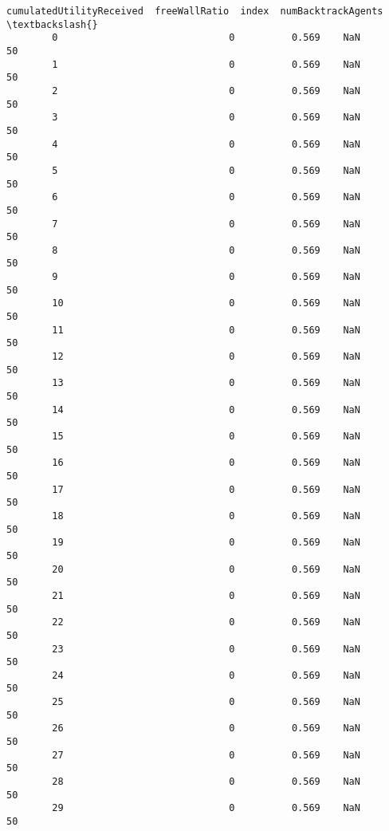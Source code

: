 \documentclass[11pt]{article}
\begin{document}
\begin{Verbatim}[commandchars=\\\{\}]
                cumulatedUtilityReceived  freeWallRatio  index  numBacktrackAgents  \textbackslash{}
        0                              0          0.569    NaN                  50   
        1                              0          0.569    NaN                  50   
        2                              0          0.569    NaN                  50   
        3                              0          0.569    NaN                  50   
        4                              0          0.569    NaN                  50   
        5                              0          0.569    NaN                  50   
        6                              0          0.569    NaN                  50   
        7                              0          0.569    NaN                  50   
        8                              0          0.569    NaN                  50   
        9                              0          0.569    NaN                  50   
        10                             0          0.569    NaN                  50   
        11                             0          0.569    NaN                  50   
        12                             0          0.569    NaN                  50   
        13                             0          0.569    NaN                  50   
        14                             0          0.569    NaN                  50   
        15                             0          0.569    NaN                  50   
        16                             0          0.569    NaN                  50   
        17                             0          0.569    NaN                  50   
        18                             0          0.569    NaN                  50   
        19                             0          0.569    NaN                  50   
        20                             0          0.569    NaN                  50   
        21                             0          0.569    NaN                  50   
        22                             0          0.569    NaN                  50   
        23                             0          0.569    NaN                  50   
        24                             0          0.569    NaN                  50   
        25                             0          0.569    NaN                  50   
        26                             0          0.569    NaN                  50   
        27                             0          0.569    NaN                  50   
        28                             0          0.569    NaN                  50   
        29                             0          0.569    NaN                  50   

\end{Verbatim}
\end{document}
